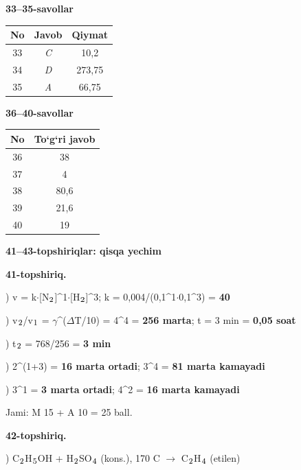 \documentclass[11pt,a4paper]{article}
\renewcommand{\textsubscript}[1]{\ensuremath{_{\text{\fontsize{8}{8}\selectfont #1}}}}
\begin{document}
\noindent\textbf{33--35-savollar}\par\smallskip
\noindent\begin{tabular}{|c|c|c|}\hline \textbf{No} & \textbf{Javob} & \textbf{Qiymat}\\\hline
33 & \textsl{C} & 10,2\\\hline
34 & \textsl{D} & 273,75\\\hline
35 & \textsl{A} & 66,75\\\hline
\end{tabular}\par\medskip
\noindent\textbf{36--40-savollar}\par\smallskip
\noindent\begin{tabular}{|c|c|}\hline \textbf{No} & \textbf{To`g`ri javob}\\\hline
36 & 38\\\hline
37 & 4\\\hline
38 & 80,6\\\hline
39 & 21,6\\\hline
40 & 19\\\hline
\end{tabular}\par\medskip
\noindent\textbf{41--43-topshiriqlar: qisqa yechim}\par\smallskip
\noindent\textbf{41-topshiriq.}\par
{}) v = k$\cdot$[N\textsubscript{2}]\textasciicircum{}1$\cdot$[H\textsubscript{2}]\textasciicircum{}3; k = 0,004/(0,1\textasciicircum{}1$\cdot$0,1\textasciicircum{}3) = \textbf{40}\par
{}) v\textsubscript{2}/v\textsubscript{1} = $\gamma$\textasciicircum{}($\Delta$T/10) = 4\textasciicircum{}4 = \textbf{256 marta}; t = 3 min = \textbf{0,05 soat}\par
{}) t\textsubscript{2} = 768/256 = \textbf{3 min}\par
{}) 2\textasciicircum{}(1+3) = \textbf{16 marta ortadi}; 3\textasciicircum{}4 = \textbf{81 marta kamayadi}\par
{}) 3\textasciicircum{}1 = \textbf{3 marta ortadi}; 4\textasciicircum{}2 = \textbf{16 marta kamayadi}\par
\noindent Jami: M 15 + A 10 = 25 ball.\par
\noindent\textbf{42-topshiriq.}\par
{}) C\textsubscript{2}H\textsubscript{5}OH + H\textsubscript{2}SO\textsubscript{4} (kons.), 170 \textdegree{}C $\to$ C\textsubscript{2}H\textsubscript{4} (etilen)\par
\end{document}
